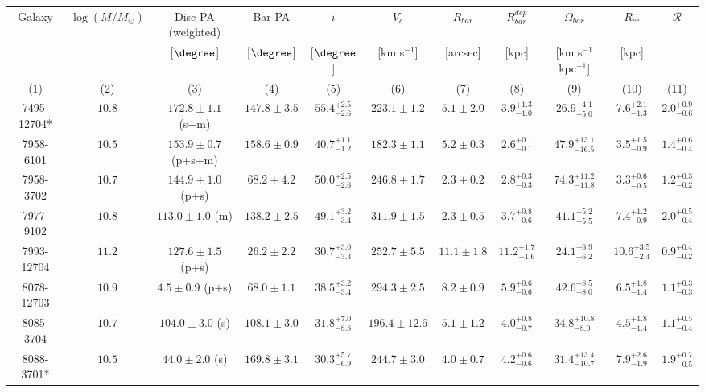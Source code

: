 \begin{landscape} 
\renewcommand{\arraystretch}{1.4} 
\begin{longtable}{ccccccccccc} 
   \hline \hline 
    Galaxy & $\log(M/M_\odot)$ & Disc PA (weighted) & Bar PA & $i$ & $V_c$ & $R_{bar}$ & $R_{bar}^{dep}$ & $\Omega_{bar}$ & $R_{cr}$ & $\mathcal{R}$  \\ 
     &  & [$\degree$] & [$\degree$] & [$\degree$] & [km s$^{-1}$] & [arcsec] & [kpc] & [km s$^{-1}$ kpc$^{-1}$] & [kpc] &   \\ 
    (1) & (2) & (3) & (4) & (5) & (6) & (7) & (8) & (9) & (10) & (11)  \\ 
   \hline 
7495-12704* & $10.8$  & $172.8 \pm 1.1$ (s+m)  & $147.8 \pm 3.5$ & $55.4^{+2.5}_{-2.6}$  & $223.1 \pm 1.2 $ & $5.1 \pm 2.0 $ & $3.9^{+1.3}_{-1.0}$  & $26.9^{+4.1}_{-5.0}$  & $7.6^{+2.1}_{-1.3}$  & $2.0^{+0.9}_{-0.6}$ \\ 
7958-6101 & $10.5$  & $153.9 \pm 0.7$ (p+s+m)  & $158.6 \pm 0.9$ & $40.7^{+1.1}_{-1.2}$  & $182.3 \pm 1.1 $ & $5.2 \pm 0.3 $ & $2.6^{+0.1}_{-0.1}$  & $47.9^{+13.1}_{-16.5}$  & $3.5^{+1.5}_{-0.9}$  & $1.4^{+0.6}_{-0.4}$ \\ 
7958-3702 & $10.7$  & $144.9 \pm 1.0$ (p+s)  & $68.2 \pm 4.2$ & $50.0^{+2.5}_{-2.6}$  & $246.8 \pm 1.7 $ & $2.3 \pm 0.2 $ & $2.8^{+0.3}_{-0.3}$  & $74.3^{+11.2}_{-11.8}$  & $3.3^{+0.6}_{-0.5}$  & $1.2^{+0.3}_{-0.2}$ \\ 
7977-9102 & $10.8$  & $113.0 \pm 1.0$ (m)  & $138.2 \pm 2.5$ & $49.1^{+3.2}_{-3.4}$  & $311.9 \pm 1.5 $ & $2.3 \pm 0.5 $ & $3.7^{+0.8}_{-0.6}$  & $41.1^{+5.2}_{-5.5}$  & $7.4^{+1.2}_{-0.9}$  & $2.0^{+0.5}_{-0.4}$ \\ 
7993-12704 & $11.2$  & $127.6 \pm 1.5$ (p+s)  & $26.2 \pm 2.2$ & $30.7^{+3.0}_{-3.3}$  & $252.7 \pm 5.5 $ & $11.1 \pm 1.8 $ & $11.2^{+1.7}_{-1.6}$  & $24.1^{+6.9}_{-6.2}$  & $10.6^{+3.5}_{-2.4}$  & $0.9^{+0.4}_{-0.2}$ \\ 
8078-12703 & $10.9$  & $4.5 \pm 0.9$ (p+s)  & $68.0 \pm 1.1$ & $38.5^{+3.2}_{-3.4}$  & $294.3 \pm 2.5 $ & $8.2 \pm 0.9 $ & $5.9^{+0.6}_{-0.6}$  & $42.6^{+8.5}_{-8.0}$  & $6.5^{+1.8}_{-1.4}$  & $1.1^{+0.3}_{-0.3}$ \\ 
8085-3704 & $10.7$  & $104.0 \pm 3.0$ (s)  & $108.1 \pm 3.0$ & $31.8^{+7.0}_{-8.8}$  & $196.4 \pm 12.6 $ & $5.1 \pm 1.2 $ & $4.0^{+0.8}_{-0.7}$  & $34.8^{+10.8}_{-8.0}$  & $4.5^{+1.8}_{-1.4}$  & $1.1^{+0.5}_{-0.4}$ \\ 
8088-3701* & $10.5$  & $44.0 \pm 2.0$ (s)  & $169.8 \pm 3.1$ & $30.3^{+5.7}_{-6.9}$  & $244.7 \pm 3.0 $ & $4.0 \pm 0.7 $ & $4.2^{+0.6}_{-0.6}$  & $31.4^{+13.4}_{-10.7}$  & $7.9^{+2.6}_{-1.9}$  & $1.9^{+0.7}_{-0.5}$ \\ 

\end{longtable}
\end{landscape}
